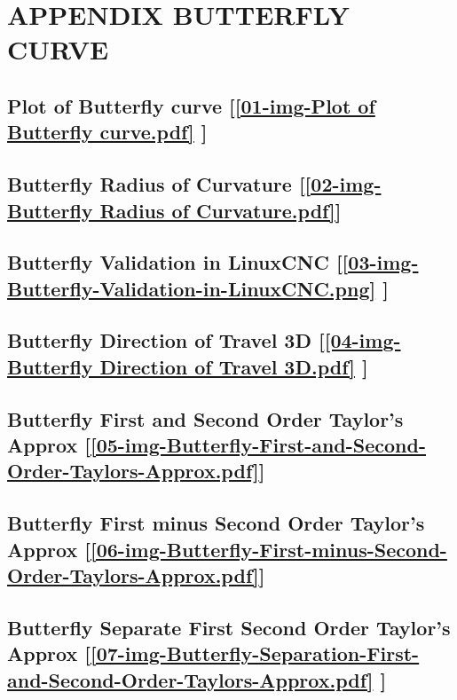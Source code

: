 
\section{\textbf{APPENDIX BUTTERFLY CURVE}} \label{APPENDIX BUTTERFLY CURVE}


\subsection       {Plot of Butterfly curve
	[\ref  {01-img-Plot of Butterfly curve.pdf} ] }
\label{ssec-01-img-Plot of Butterfly curve.pdf}

\subsection       {Butterfly Radius of Curvature
	[\ref      {02-img-Butterfly Radius of Curvature.pdf}] }
\label{ssec-02-img-Butterfly Radius of Curvature.pdf}

\subsection       {Butterfly Validation in LinuxCNC
	[\ref      {03-img-Butterfly-Validation-in-LinuxCNC.png} ] }
\label{ssec-03-img-Butterfly-Validation-in-LinuxCNC.png}

\subsection     {Butterfly Direction of Travel 3D
	[\ref      {04-img-Butterfly Direction of Travel 3D.pdf} ] }
\label{ssec-04-img-Butterfly Direction of Travel 3D.pdf}

\subsection       {Butterfly First and Second Order Taylor's Approx
	[\ref      {05-img-Butterfly-First-and-Second-Order-Taylors-Approx.pdf}] }
\label{ssec-05-img-Butterfly-First-and-Second-Order-Taylors-Approx.pdf}

\subsection       {Butterfly First minus Second Order Taylor's Approx
	[\ref      {06-img-Butterfly-First-minus-Second-Order-Taylors-Approx.pdf}] }
\label{ssec-06-img-Butterfly-First-minus-Second-Order-Taylors-Approx.pdf}

\subsection       {Butterfly Separate First Second Order Taylor's Approx
	[\ref      {07-img-Butterfly-Separation-First-and-Second-Order-Taylors-Approx.pdf} ] }
\label{ssec-07-img-Butterfly-Separation-First-and-Second-Order-Taylors-Approx.pdf}

